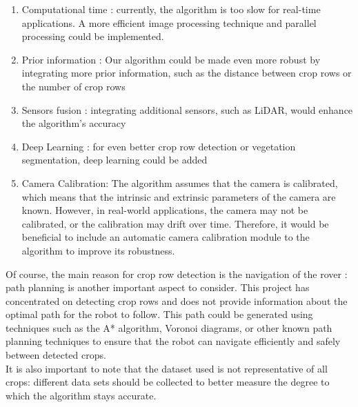 \begin{enumerate}
    \item Computational time : currently, the algorithm is too slow for real-time applications. A more efficient image processing technique and parallel processing could be implemented. 
    \item Prior information : Our algorithm could be made even more robust by integrating more prior information, such as the distance between crop rows or the number of crop rows
    \item Sensors fusion : integrating
    additional sensors, such as LiDAR, would enhance the algorithm's accuracy
    \item Deep Learning : for even better crop row detection or vegetation segmentation, deep learning could be added
    \item Camera Calibration: The algorithm assumes that the camera is
    calibrated, which means that the intrinsic and extrinsic parameters of
    the camera are known. However, in real-world applications, the camera
    may not be calibrated, or the calibration may drift over time.
    Therefore, it would be beneficial to include an automatic camera
    calibration module to the algorithm to improve its robustness. \\
\end{enumerate}

Of course, the main reason for crop row detection is the navigation of the rover : path planning is another important aspect to consider. This project has concentrated on detecting crop rows and does not provide
information about the optimal path for the robot to follow. This path could be generated using techniques such 
as the A* algorithm, Voronoi diagrams, or other known path planning
techniques to ensure that the robot can navigate efficiently and safely between detected crops. \\

It is also important to note that the dataset used is not representative of all crops: different data sets should be collected to better measure the degree to which the algorithm stays accurate.

